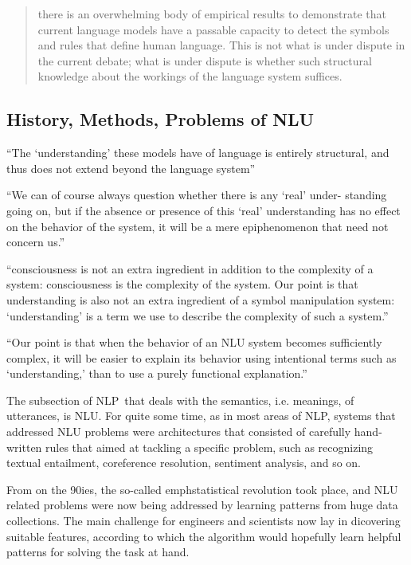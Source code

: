 \begin{quote}
  there is an overwhelming body of empirical results to demonstrate that current language models
  have a passable capacity to detect the symbols and rules that define human language. This is not
  what is under dispute in the current debate; what is under dispute is whether such structural
  knowledge about the workings of the language system suffices.
\end{quote}

\subsection{History, Methods, Problems of NLU}


``The `understanding' these models have of language is entirely structural,
and thus does not extend beyond the language system'' \cite{sahlgren2021singleton}

``We can of course always question whether there is any `real' under-
standing going on, but if the absence or presence of this `real' understanding
has no effect on the behavior of the system, it will be a mere epiphenomenon
that need not concern us.'' \cite{sahlgren2021singleton}

``consciousness is not an extra ingredient in addition to the complexity of a system:
consciousness is the complexity of the system. Our point is that understanding is also
not an extra ingredient of a symbol manipulation system: `understanding' is a term we
use to describe the complexity of such a system.'' \cite{sahlgren2021singleton}

``Our point is that when the behavior of an NLU system becomes sufficiently complex, it will be
easier to explain its behavior using intentional terms such as `understanding,' than to use a
purely functional explanation.'' \cite{sahlgren2021singleton}

The subsection of NLP that deals with the semantics, i.e. meanings, of utterances, is NLU.
For quite some time, as in most areas of NLP, systems that addressed NLU problems were
architectures that consisted of carefully hand-written rules that aimed at tackling a specific
problem, such as recognizing textual entailment, coreference resolution, sentiment analysis,
and so on.

From on the 90ies, the so-called emph{statistical revolution} took place, and NLU related
problems were now being addressed by learning patterns from huge data collections.  The main
challenge for engineers and scientists now lay in dicovering suitable features, according to
which the algorithm would hopefully learn helpful patterns for solving the task at hand.

